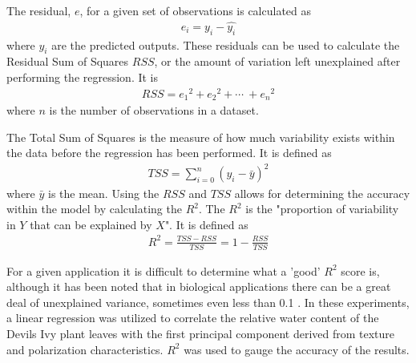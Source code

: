The residual, $e$, for a given set of observations is calculated as
%
\begin{align}
    e_i = y_i - \hat{y_i}
\end{align}
%
where $\hat{y_i}$ are the predicted outputs. These residuals can be used to calculate the Residual Sum of Squares \(RSS\), or the amount of variation left unexplained after performing the regression.  It is
\begin{align}
    RSS = {e_1}^2 + {e_2}^2 + \cdots\ + {e_n}^2
\end{align}
where $n$ is the number of observations in a dataset.

The Total Sum of Squares is the measure of how much variability exists within the data before the regression has been performed.  It is defined as
\begin{align}
    TSS = \sum_{i=0}^n (y_i - \bar{y})^2
\end{align}
where $\bar{y}$ is the mean.  Using the $RSS$ and $TSS$ allows for determining the accuracy within the model by calculating the $R^2$.  The $R^2$ is the "proportion of variability in $Y$ that can be explained by $X$". It is defined as
\begin{align}
    R^2 = \frac{TSS - RSS}{TSS} = 1 - \frac{RSS}{TSS}
\end{align}

For a given application it is difficult to determine what a 'good' $R^2$ score is, although it has been noted that in biological applications there can be a great deal of unexplained variance, sometimes even less than 0.1 \cite{stats}.  In these experiments, a linear regression was utilized to correlate the relative water content of the Devils Ivy plant leaves with the first principal component derived from texture and polarization characteristics.  $R^2$ was used to gauge the accuracy of the results.

